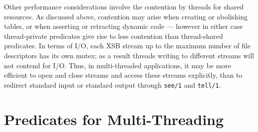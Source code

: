 Other performance considerations involve the contention by threads for
shared resources.  As discussed above, contention may arise when
creating or abolishing tables, or when asserting or retracting dynamic
code --- however in either case thread-private predicates give rise to
less contention than thread-shared predicates.  In terms of I/O, each
XSB stream up to the maximum number of file descriptors has its own
mutex; as a result threads writing to different streams will not
contend for I/O.  Thus, in multi-threaded applications, it may be more
efficient to open and close streams and access these streams
explicitly, than to redirect standard input or standard output through
{\tt see/1} and {\tt tell/1}.

\section{Predicates for Multi-Threading} \label{sec:mt-threading}

